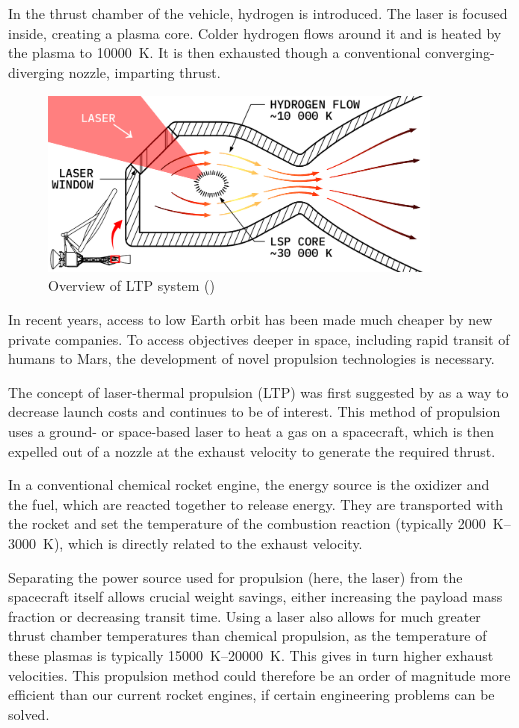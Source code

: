         In the thrust chamber of the vehicle, hydrogen is introduced. The laser is focused inside, creating a plasma core. Colder hydrogen flows around it and is heated by the plasma to \qty{10000}{K}. It is then exhausted though a conventional converging-diverging nozzle, imparting thrust.

        \begin{figure}[!ht]
            \centering
            \includegraphics[width=0.9\textwidth]{assets/2 background/chamber.pdf}
            \caption{Overview of LTP system (\textcite{duplayArgonLaserPlasmaThruster2024a})}
            \label{fig:LTP system overview}
        \end{figure}
        

        In recent years, access to low Earth orbit has been made much cheaper by new private companies. To access objectives deeper in space, including rapid transit of humans to Mars, the development of novel propulsion technologies is necessary.

        The concept of laser-thermal propulsion (LTP) was first suggested by \textcite{kantrowitzRelevanceSpace1971} as a way to decrease launch costs and continues to be of interest. This method of propulsion uses a ground- or space-based laser to heat a gas on a spacecraft, which is then expelled out of a nozzle at the exhaust velocity to generate the required thrust.

        In a conventional chemical rocket engine, the energy source is the oxidizer and the fuel, which are reacted together to release energy. They are transported with the rocket and set the temperature of the combustion reaction (typically \qtyrange{2000}{3000}{K}), which is directly related to the exhaust velocity.
        
        Separating the power source used for propulsion (here, the laser) from the spacecraft itself allows crucial weight savings, either increasing the payload mass fraction or decreasing transit time. Using a laser also allows for much greater thrust chamber temperatures than chemical propulsion, as the temperature of these plasmas is typically \qtyrange{15000}{20000}{K}. This gives in turn higher exhaust velocities. This propulsion method could therefore be an order of magnitude more efficient than our current rocket engines, if certain engineering problems can be solved.

